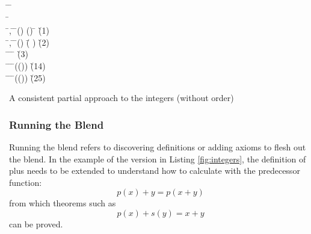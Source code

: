 \begin{listing}[!ht]
\begin{mdframed}
\begin{hetcasl}
\> \OP \= \Ax{:} \= \Ax{\rightarrow} \\
\> \OP \= \Ax{:} \\
\> \Ax{\forall} \=,  \Ax{:}  \=\Ax{\bullet} \=() \Ax{=} () \Ax{\Rightarrow} \= \Ax{=}  \`{\small{}\KW{\%}(1)\KW{\%}}\\
\> \Ax{\forall} \=,  \Ax{:}  \=\Ax{\bullet} \=() \Ax{+}  \Ax{=} (\= \Ax{+} ) \`{\small{}\KW{\%}(2)\KW{\%}}\\
\> \Ax{\forall} \= \Ax{:}  \=\Ax{\bullet} \= \Ax{+}  \Ax{=}  \`{\small{}\KW{\%}(3)\KW{\%}}\\
\> \Ax{\forall} \= \Ax{:}  \=\Ax{\bullet} \=(()) \Ax{=}  \`{\small{}\KW{\%}(1\Ax{\_}4)\KW{\%}}\\
\> \Ax{\forall} \= \Ax{:}  \=\Ax{\bullet} \=(()) \Ax{=}  \`{\small{}\KW{\%}(2\Ax{\_}5)\KW{\%}}\\
\end{hetcasl}
\end{mdframed}
\caption{A consistent partial approach to the integers (without order)}
\label{fig:integers}
\end{listing}

\subsubsection{Running the Blend}

Running the blend refers to discovering definitions or adding axioms
to flesh out the blend.  In the example of the version in Listing
\ref{fig:integers}, the definition of plus needs to be extended to
understand how to calculate with the predecessor function:
$$
p(x) + y = p(x+y)
$$
\noindent from which theorems such as 
$$
p(x) + s(y) = x+y
$$
\noindent can be proved.



